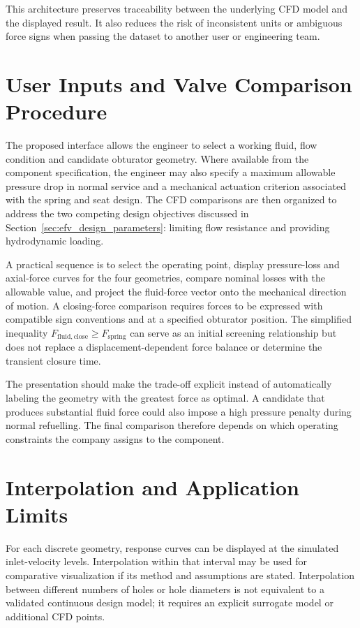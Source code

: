 This architecture preserves traceability between the underlying CFD model and the displayed result. It also reduces the risk of inconsistent units or ambiguous force signs when passing the dataset to another user or engineering team.

\section{User Inputs and Valve Comparison Procedure}
\label{sec:recommendation_logic}

The proposed interface allows the engineer to select a working fluid, flow condition and candidate obturator geometry. Where available from the component specification, the engineer may also specify a maximum allowable pressure drop in normal service and a mechanical actuation criterion associated with the spring and seat design. The CFD comparisons are then organized to address the two competing design objectives discussed in Section~\ref{sec:efv_design_parameters}: limiting flow resistance and providing hydrodynamic loading.

A practical sequence is to select the operating point, display pressure-loss and axial-force curves for the four geometries, compare nominal losses with the allowable value, and project the fluid-force vector onto the mechanical direction of motion. A closing-force comparison requires forces to be expressed with compatible sign conventions and at a specified obturator position. The simplified inequality $F_{\mathrm{fluid,close}}\geq F_{\mathrm{spring}}$ can serve as an initial screening relationship but does not replace a displacement-dependent force balance or determine the transient closure time.

The presentation should make the trade-off explicit instead of automatically labeling the geometry with the greatest force as optimal. A candidate that produces substantial fluid force could also impose a high pressure penalty during normal refuelling. The final comparison therefore depends on which operating constraints the company assigns to the component.

\section{Interpolation and Application Limits}
\label{sec:selection_coverage}

For each discrete geometry, response curves can be displayed at the simulated inlet-velocity levels. Interpolation within that interval may be used for comparative visualization if its method and assumptions are stated. Interpolation between different numbers of holes or hole diameters is not equivalent to a validated continuous design model; it requires an explicit surrogate model or additional CFD points.

